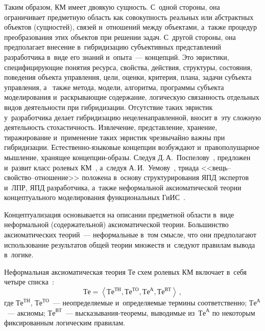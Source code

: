 \begin{multicols}{2}
Таким 
образом, КМ имеет двоякую сущность. С~одной стороны, она 
ограничивает предметную область как совокупность реальных или абстрактных объектов 
(сущностей), связей и~отношений между объектами, а~также процедур %
 преобразования этих 
объектов при решении задач. С~другой стороны, она предполагает внесение в~гибридизацию 
субъективных представлений %
разработчика в~виде его знаний и~опыта~--- концепций. Это 
эвристики, специфицирующие по\-нятия ресурса, свойства, действия, структуры, со\-сто\-яния, 
поведения объекта управления, цели, оценки, критерия, плана, задачи субъекта управления, а~
также %
метода, модели, алгоритма, программы субъекта моделирования и~раскрывающие 
содержание, логическую связанность отдельных видов де\-я\-тель\-ности при гибридизации. 
Отсутствие таких эвристик у~разработчика делает гибридизацию 
не\-це\-ле\-на\-прав\-лен\-ной, 
вносит в~эту сложную де\-я\-тель\-ность стохастичность. 
Извлечение, пред\-став\-ле\-ние, хранение, 
тиражирование и~применение %
 таких эвристик чрезвычайно важны при гиб\-ри\-ди\-за\-ции.  
Ес\-те\-ст\-вен\-но-язы\-ко\-вые концепции воз\-буж\-да\-ют %
 и~правополу\-шарное мышление, 
хранящее кон\-цеп\-ции-об\-ра\-зы. Следуя Д.\,А.~Поспелову~\cite{10-kir},
 предложен и~развит 
класс ролевых КМ~\cite{7-kir}, а~следуя %
А.\,И.~Уемо\-ву~\cite{11-kir}, 
триада <<вещь--свой\-ст\-во--от\-но\-ше\-ние>> положена в~основу структурирования ЯПД 
экспертов и~ЛПР, ЯПД разработчика, а~также 
неформальной аксиоматической теории концептуального моделирования функциональных 
\mbox{ГиИС}~\cite{12-kir}. 
  
  Концептуализация основывается на описании предметной области в~виде неформальной 
(содержательной) аксиоматической теории. Большинство аксиоматических теорий~--- 
неформальные в~том смысле, что они предполагают использование результатов общей 
теории множеств и~следуют правилам вывода в~логике.
  
  Неформальная аксиоматическая теория Те схем ролевых КМ
включает в~себя четыре списка~\cite{13-kir}: 
  \begin{equation}
  \mathrm{Те}= \left\langle \mathrm{Те}^{\mathrm{ТН}}, 
  \mathrm{Те}^{\mathrm{ТО}}, \mathrm{Те}^{\mathrm{А}}, \mathrm{Те}^{\mathrm{ВТ}}\right\rangle\,,
  \label{e1-kir}
  \end{equation}
    где $\mathrm{Те}^{\mathrm{ТН}}$, $\mathrm{Те}^{\mathrm{ТО}}$~--- 
    неопределяемые и~определяемые термины соответственно; 
$\mathrm{Те}^{\mathrm{А}}$~--- аксиомы; $\mathrm{Те}^{\mathrm{ВТ}}$~--- 
вы\-ска\-зы\-ва\-ния-тео\-ре\-мы, выводимые из~$\mathrm{Те}^{\mathrm{А}}$ 
по некоторым фиксированным логическим правилам. 
  

\end{multicols}
